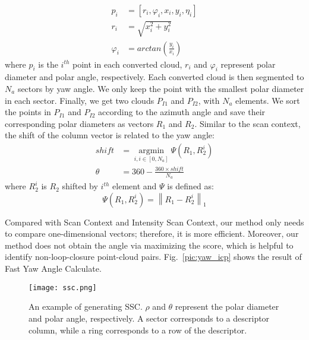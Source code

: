 \documentclass[letterpaper, 10 pt, conference]{ieeeconf}  %
\begin{document}
\begin{equation}
    \begin{aligned}
    p_i&=[r_i,\varphi_i  ,x_i,y_i,\eta_i ] \\
    r_i&=\sqrt{x_i^2+y_i^2} \\
    \varphi_i &=arctan(\frac{y_i}{x_i} )
    \end{aligned}
\end{equation}
where \(p_i\) is the \(i^{th}\) point in each converted cloud, \(r_i\) and \(\varphi_i\) represent polar diameter and polar angle, respectively. Each converted cloud is then segmented to \( N_a\) sectors by yaw angle. We only keep the point with the smallest polar diameter in each sector. Finally, we get two clouds \(P_{I1}\) and \(P_{I2}\), with \(N_a\) elements. We sort the points in \(P_{I1}\) and \(P_{I2}\) according to the azimuth angle and save their corresponding polar diameters as vectors \(R_1\) and \(R_2\). Similar to the scan context, the shift of the column vector is related to the yaw angle:
 \begin{equation}\label{equ:shift}
    \begin{aligned}
     shift&=\mathop{argmin}\limits_{i, i\in [0,N_a]}\varPsi (R_1,R_2^i) \\
     \theta&=360-\frac{360\times shift}{N_a} 
    \end{aligned}
 \end{equation}
where \(R_2^i\) is \(R_2\) shifted by \(i^{th}\) element and \(\varPsi\) is defined as:
\begin{equation}
    \varPsi (R_1,R_2^i)=\left\lVert R_1-R_2^i\right\rVert_1 
\end{equation}

Compared with Scan Context and Intensity Scan Context, our method only needs to compare one-dimensional vectors; therefore, it is more efficient. Moreover, our method does not obtain the angle via maximizing the score, which is helpful to identify non-loop-closure point-cloud pairs. Fig.~\ref{pic:yaw_icp} shows the result of Fast Yaw Angle Calculate.

\begin{figure}[t]
    \centering
        \texttt{[image: ssc.png]}\vspace{-2mm}
    \caption{An example of generating SSC. \(\rho\) and \(\theta\) represent the polar diameter and polar angle, respectively. A sector corresponds to a descriptor column, while a ring corresponds to a row of the descriptor.}
    \label{pic:ssc}
 \end{figure}
\end{document}
